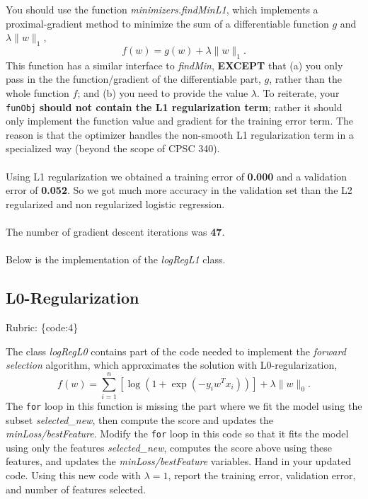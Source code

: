 \documentclass{article}
\def\rubric#1{\gre{Rubric: \{#1\}}}{}
\def\blu#1{{\color{blu}#1}}
\def\gre#1{{\color{gre}#1}}
\def\norm#1{\|#1\|}
\def\ans#1{{\color{ans}#1}}
\begin{document}
You should use the function \emph{minimizers.findMinL1}, which implements a
proximal-gradient method to minimize the sum of a differentiable function $g$ and $\lambda\norm{w}_1$,
\[
f(w) = g(w) + \lambda \norm{w}_1.
\]
This function has a similar interface to \emph{findMin}, \textbf{EXCEPT} that (a) you
only pass in the the function/gradient of the differentiable
part, $g$, rather than the whole function $f$; and (b) you need to provide the value $\lambda$.
To reiterate, your \texttt{funObj} \textbf{should not contain the L1 regularization term}; rather it
should only implement the function value and gradient for the training error term. The reason is that 
the optimizer handles the non-smooth L1 regularization term in a specialized way (beyond the scope of CPSC 340). \\ \\
\ans{
    Using L1 regularization we obtained a training error of \textbf{0.000} and a validation error of \textbf{0.052}.
    So we got much more accuracy in the validation set than the L2 regularized and non regularized logistic 
    regression. \\ \\
    The number of gradient descent iterations was \textbf{47}. \\ \\
    Below is the implementation of the \emph{logRegL1} class.
}
\begin{center}
     
\end{center}

\subsection{L0-Regularization}
\rubric{code:4}

The class \emph{logRegL0} contains part of the code needed to implement the \emph{forward selection} algorithm,
which approximates the solution with L0-regularization,
\[
f(w) =  \sum_{i=1}^n \left[\log(1+\exp(-y_iw^Tx_i))\right] + \lambda\norm{w}_0.
\]
The \texttt{for} loop in this function is missing the part where we fit the model using the subset \emph{selected\_new},
then compute the score and updates the \emph{minLoss/bestFeature}.
Modify the \texttt{for} loop in this code so that it fits the model using only
the features \emph{selected\_new}, computes the score above using these features,
and updates the \emph{minLoss/bestFeature} variables.
\blu{Hand in your updated code. Using this new code with $\lambda=1$,
report the training error, validation error, and number of features selected.}
\end{document}
